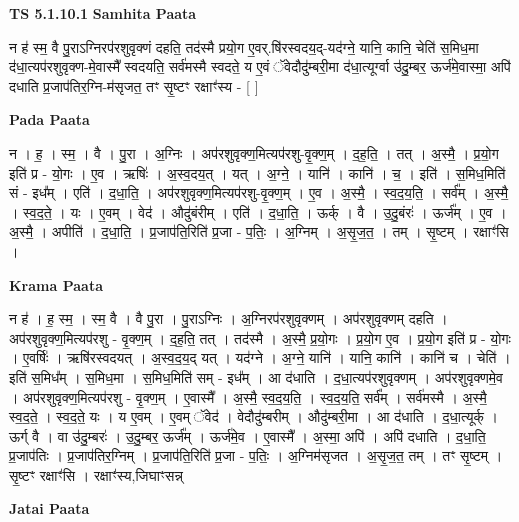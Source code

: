 \documentclass[17pt]{extarticle}
\begin{document}
\textbf{TS 5.1.10.1 } \newline
\textbf{Samhita Paata} \newline

न ह॑ स्म॒ वै पु॒राऽग्निरप॑रशुवृक्णं दहति॒ तद॑स्मै प्रयो॒ग ए॒वर्.षि॑रस्वदय॒द्-यद॑ग्ने॒ यानि॒ कानि॒ चेति॑ स॒मिध॒मा द॑धा॒त्यप॑रशुवृक्ण-मे॒वास्मै᳚ स्वदयति॒ सर्व॑मस्मै स्वदते॒ य ए॒वं ॅवेदौदु॑म्बरी॒मा द॑धा॒त्यूर्ग्वा उ॑दु॒म्बर॒ ऊर्ज॑मे॒वास्मा॒ अपि॑ दधाति प्र॒जाप॑तिर॒ग्नि-म॑सृजत॒ तꣳ सृ॒ष्टꣳ रक्षाꣳ॑स्य - [  ] \newline

\textbf{Pada Paata} \newline

न । ह॒ । स्म॒ । वै । पु॒रा । अ॒ग्निः । अप॑रशुवृक्ण॒मित्यप॑रशु-वृ॒क्ण॒म् । द॒ह॒ति॒ । तत् । अ॒स्मै॒ । प्र॒यो॒ग इति॑ प्र - यो॒गः । ए॒व । ऋषिः॑ । अ॒स्व॒दय॒त् । यत् । अ॒ग्ने॒ । यानि॑ । कानि॑ । च॒ । इति॑ । स॒मिध॒मिति॑ सं - इध᳚म् । एति॑ । द॒धा॒ति॒ । अप॑रशुवृक्ण॒मित्यप॑रशु-वृ॒क्ण॒म् । ए॒व । अ॒स्मै॒ । स्व॒द॒य॒ति॒ । सर्व᳚म् । अ॒स्मै॒ । स्व॒द॒ते॒ । यः । ए॒वम् । वेद॑ । औदु॑बंरीम् । एति॑ । द॒धा॒ति॒ । ऊर्क् । वै । उ॒दु॒बंरः॑ । ऊर्ज᳚म् । ए॒व । अ॒स्मै॒ । अपीति॑ । द॒धा॒ति॒ । प्र॒जाप॑ति॒रिति॑ प्र॒जा - प॒तिः॒ । अ॒ग्निम् । अ॒सृ॒ज॒त॒ । तम् । सृ॒ष्टम् । रक्षाꣳ॑सि ।  \newline


\textbf{Krama Paata} \newline

न ह॑ । ह॒ स्म॒ । स्म॒ वै । वै पु॒रा । पु॒राऽग्निः । अ॒ग्निरप॑रशुवृक्णम् । अप॑रशुवृक्णम् दहति । अप॑रशुवृक्ण॒मित्यप॑रशु - वृ॒क्ण॒म् । द॒ह॒ति॒ तत् । तद॑स्मै । अ॒स्मै॒ प्र॒यो॒गः । प्र॒यो॒ग ए॒व । प्र॒यो॒ग इति॑ प्र - यो॒गः । ए॒वर्षिः॑ । ऋषि॑रस्वदयत् । अ॒स्व॒द॒य॒द् यत् । यद॑ग्ने । अ॒ग्ने॒ यानि॑ । यानि॒ कानि॑ । कानि॑ च । चेति॑ । इति॑ स॒मिध᳚म् । स॒मिध॒मा । स॒मिध॒मिति॑ सम् - इध᳚म् । आ द॑धाति । द॒धा॒त्यप॑रशुवृक्णम् । अप॑रशुवृक्णमे॒व । अप॑रशुवृक्ण॒मित्यप॑रशु - वृ॒क्ण॒म् । ए॒वास्मै᳚ । अ॒स्मै॒ स्व॒द॒य॒ति॒ । स्व॒द॒य॒ति॒ सर्व᳚म् । सर्व॑मस्मै । अ॒स्मै॒ स्व॒द॒ते॒ । स्व॒द॒ते॒ यः । य ए॒वम् । ए॒वम् ॅवेद॑ । वेदौदु॑म्बरीम् । औदु॑म्बरी॒मा । आ द॑धाति । द॒धा॒त्यूर्क् । ऊर्ग् वै । वा उ॑दु॒म्बरः॑ । उ॒दु॒म्बर॒ ऊर्ज᳚म् । ऊर्ज॑मे॒व । ए॒वास्मै᳚ । अ॒स्मा॒ अपि॑ । अपि॑ दधाति । द॒धा॒ति॒ प्र॒जाप॑तिः । प्र॒जाप॑तिर॒ग्निम् । प्र॒जाप॑ति॒रिति॑ प्र॒जा - प॒तिः॒ । अ॒ग्निम॑सृजत । अ॒सृ॒ज॒त॒ तम् । तꣳ सृ॒ष्टम् । सृ॒ष्टꣳ रक्षाꣳ॑सि । रक्षाꣳ॑स्य,जिघाꣳसन्न् \newline

\textbf{Jatai Paata} \newline
\end{document}
